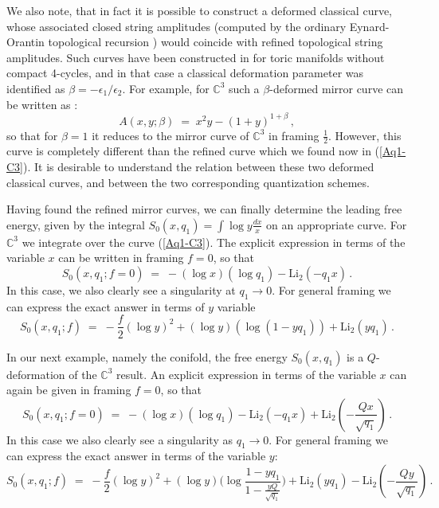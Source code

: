 \documentclass[hyper,letterpaper]{JHEP3}
\newcommand{\be}{\begin{equation}}
\newcommand{\ee}{\end{equation}}
\newcommand{\C}{{\mathbb C}}
\begin{document}
We also note, that in fact it is possible to construct a deformed classical curve, whose associated closed string amplitudes (computed by the ordinary Eynard-Orantin topological recursion \cite{eyn-or}) would coincide with refined topological string amplitudes. Such curves have been constructed in \cite{Sulkowski:2010ux,Sulkowski:2011qs,Eynard:2011vs} for toric manifolds without compact 4-cycles, and in that case a classical deformation parameter was identified as $\beta=-\epsilon_1/\epsilon_2$. For example, for $\C^3$ such a $\beta$-deformed mirror curve can be written as \cite{Eynard:2011vs}:
\be
A(x,y;\beta) \; = \; x^2 y - (1+y)^{1+\beta} \,,
\ee
so that for $\beta=1$ it reduces to the mirror curve of $\C^3$ in framing $\frac{1}{2}$.
However, this curve is completely different than the refined curve which we found now in (\ref{Aq1-C3}). It is desirable to understand the relation between these two deformed classical curves, and between the two corresponding quantization schemes.



Having found the refined mirror curves, we can finally determine the leading free energy,
given by the integral $S_0(x,q_1)=\int\log y\frac{dx}{x}$ on an appropriate curve.
For $\C^3$ we integrate over the curve (\ref{Aq1-C3}). The explicit expression in terms of the variable $x$
can be written in framing $f=0$, so that
\be
S_0 (x,q_1; f=0) \; = \; - (\log x) ( \log q_1) - \textrm{Li}_2 (-q_1 x) \,.
\label{S0C3}
\ee
In this case, we also clearly see a singularity at $q_1\to 0$. For general framing we can express the exact answer in terms of $y$ variable
\be
S_0(x,q_1; f) \; = \; -\frac{f}{2}  ( \log y)^2 + (\log y) (\log(1-y q_1)) + \textrm{Li}_2(y q_1) \,.
\ee

In our next example, namely the conifold, the free energy $S_0(x,q_1)$ is a $Q$-deformation of the $\C^3$ result.
An explicit expression in terms of the variable $x$ can again be given in framing $f=0$, so that
\be
S_0(x,q_1; f=0) \; = \; - (\log x) ( \log q_1) - \textrm{Li}_2 (-q_1 x) + \textrm{Li}_2 (-\frac{Q x}{\sqrt{q_1}}) \,.
\label{S0conifold}
\ee
In this case we also clearly see a singularity as $q_1\to 0$.
For general framing we can express the exact answer in terms of the variable $y$:
\be
S_0 (x,q_1; f) \; = \; -\frac{f}{2}  ( \log y)^2 + (\log y) \Big(\log\frac{1-y q_1}{1 - \frac{y Q}{\sqrt{q_1}}}\Big) + \textrm{Li}_2(y q_1)
- \textrm{Li}_2 (-\frac{Q y}{\sqrt{q_1}}) \,.
\ee


\end{document}
